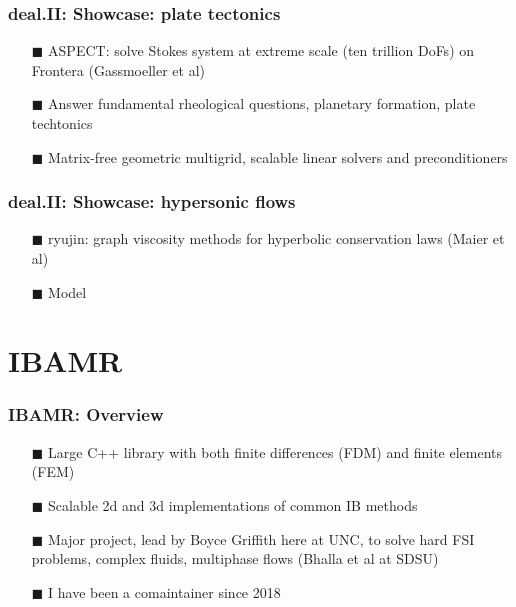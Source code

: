 \documentclass[8pt]{beamer}
\begin{document}
\begin{frame}
    \frametitle{deal.II: Showcase: plate tectonics}
    \begin{figure}
        \centering
    \end{figure}
    \begin{itemize}
        \item[$\blacksquare$] ASPECT: solve Stokes system at extreme scale (ten trillion DoFs) on Frontera (Gassmoeller et al)
        \item[$\blacksquare$] Answer fundamental rheological questions, planetary formation, plate techtonics
        \item[$\blacksquare$] Matrix-free geometric multigrid, scalable linear solvers and preconditioners
    \end{itemize}
\end{frame}

\begin{frame}
    \frametitle{deal.II: Showcase: hypersonic flows}
    \begin{figure}
        \centering
    \end{figure}
    \begin{itemize}
        \item[$\blacksquare$] ryujin: graph viscosity methods for hyperbolic conservation laws (Maier et al)
        \item[$\blacksquare$] Model 
    \end{itemize}
\end{frame}

\section{IBAMR}
\begin{frame}
    \frametitle{IBAMR: Overview}
    \begin{figure}
        \centering
    \end{figure}
    \begin{itemize}
        \item[$\blacksquare$] Large C++ library with both finite differences (FDM) and finite elements (FEM)
        \item[$\blacksquare$] Scalable 2d and 3d implementations of common IB methods
        \item[$\blacksquare$] Major project, lead by Boyce Griffith here at UNC, to solve hard FSI problems,
             complex fluids, multiphase flows (Bhalla et al at SDSU)
        \item[$\blacksquare$] I have been a comaintainer since 2018
    \end{itemize}
\end{frame}
\end{document}
